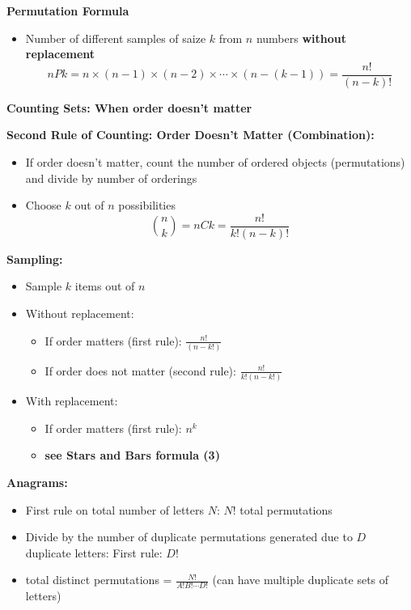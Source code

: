 \documentclass{article}\usepackage{amsmath,amssymb,amsthm,tikz,tkz-graph,color,chngpage,soul,hyperref,csquotes,graphicx,floatrow, listings}\newcommand*{\QEDB}{\hfill\ensuremath{\square}}\newtheorem*{prop}{Proposition}\renewcommand{\theenumi}{\alph{enumi}}\usepackage[shortlabels]{enumitem}\usepackage[nobreak=true]{mdframed}\usetikzlibrary{matrix,calc}\MakeOuterQuote{"}\usepackage[margin=0.75in]{geometry} \newtheorem{theorem}{Theorem}\newcommand{\Z}{\mathbb Z}\newcommand{\R}{\mathbb R}\newcommand{\Q}{\mathbb Q}\newcommand{\N}{\mathbb N}
\begin{document}
\begin{mdframed}
\textbf{Permutation Formula}
\begin{itemize}
    \item Number of different samples of saize $k$ from $n$ numbers \textbf{without replacement}
        \begin{equation}nPk = n \times (n-1) \times (n-2) \times\cdots \times (n-(k-1)) = \frac{n!}{(n-k)!}\end{equation}
\end{itemize}
\end{mdframed}
\textbf{Counting Sets: When order doesn't matter}
\begin{mdframed}
\textbf{Second Rule of Counting: Order Doesn't Matter (Combination):}
\begin{itemize}
    \item If order doesn't matter, count the number of ordered objects (permutations) and divide by number of orderings
    \item Choose $k$ out of $n$ possibilities
    \begin{equation}\binom{n}{k}= nCk = \frac{n!}{k!(n-k)!}\end{equation}
\end{itemize}
\end{mdframed}
\begin{mdframed}
\textbf{Sampling:}
\begin{itemize}
    \item Sample $k$ items out of $n$
    \item Without replacement:
    \begin{itemize}
        \item If order matters (first rule): $\frac{n!}{(n-k!)}$
        \item If order does not matter (second rule): $\frac{n!}{k!(n-k!)}$
    \end{itemize}
    \item With replacement:
    \begin{itemize}
        \item If order matters (first rule): $n^k$
        \item \textbf{see Stars and Bars formula (3)}
    \end{itemize}
\end{itemize}
\end{mdframed}
\textbf{Anagrams:}
\begin{itemize}
    \item First rule on total number of letters $N$: $N!$ total permutations
    \item Divide by the number of duplicate permutations generated due to $D$ duplicate letters: First rule: $D!$
    \item total distinct permutations = $\frac{N!}{A!B!\cdots D!}$ (can have multiple duplicate sets of letters)
\end{itemize}
\end{document}
